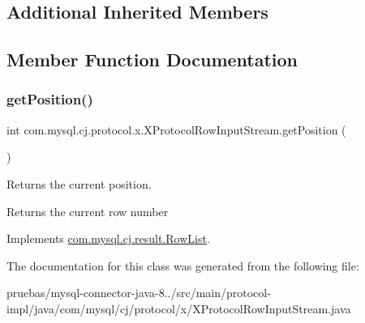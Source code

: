 \subsection*{Additional Inherited Members}


\subsection{Member Function Documentation}
\mbox{\label{classcom_1_1mysql_1_1cj_1_1protocol_1_1x_1_1_x_protocol_row_input_stream_ae168f4e9360c0d78dcb34cd3e3842d7c}} 
\subsubsection{\texorpdfstring{get\+Position()}{getPosition()}}
{\footnotesize\ttfamily int com.\+mysql.\+cj.\+protocol.\+x.\+X\+Protocol\+Row\+Input\+Stream.\+get\+Position (\begin{DoxyParamCaption}{ }\end{DoxyParamCaption})}

Returns the current position.

\begin{DoxyReturn}{Returns}
the current row number 
\end{DoxyReturn}


Implements \mbox{\hyperlink{interfacecom_1_1mysql_1_1cj_1_1result_1_1_row_list_a403554a1f4945bd623ed3b7489674a2e}{com.\+mysql.\+cj.\+result.\+Row\+List}}.



The documentation for this class was generated from the following file\+:\begin{DoxyCompactItemize}
\item 
pruebas/mysql-\/connector-\/java-\/8../src/main/protocol-\/impl/java/com/mysql/cj/protocol/x/X\+Protocol\+Row\+Input\+Stream.\+java\end{DoxyCompactItemize}
